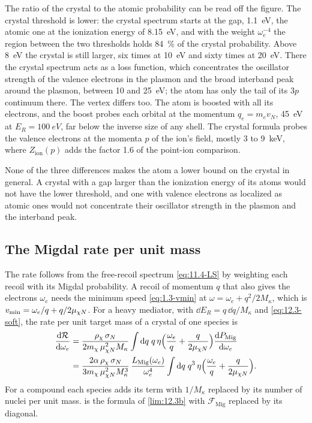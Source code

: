 The ratio of the crystal to the atomic probability can be read off the figure. The crystal threshold is lower: the crystal spectrum starts at the gap, \SI{1.1}{eV}, the atomic one at the ionization energy of \SI{8.15}{eV}, and with the weight $\omega_e^{-4}$ the region between the two thresholds holds \SI{84}{\percent} of the crystal probability. Above \SI{8}{eV} the crystal is still larger, six times at \SI{10}{eV} and sixty times at \SI{20}{eV}. There the crystal spectrum acts as a loss function, which concentrates the oscillator strength of the valence electrons in the plasmon and the broad interband peak around the plasmon, between 10 and \SI{25}{eV}; the atom has only the tail of its $3p$ continuum there. The vertex differs too. The atom is boosted with all its electrons, and the boost probes each orbital at the momentum $q_e = m_ev_N$, \SI{45}{eV} at $E_R = \SI{100}{eV}$, far below the inverse size of any shell. The crystal formula probes the valence electrons at the momenta $p$ of the ion's field, mostly 3 to \SI{9}{keV}, where $Z_{\mathrm{ion}}(p)$ adds the factor 1.6 of the point-ion comparison.

None of the three differences makes the atom a lower bound on the crystal in general. A crystal with a gap larger than the ionization energy of its atoms would not have the lower threshold, and one with valence electrons as localized as atomic ones would not concentrate their oscillator strength in the plasmon and the interband peak.

\subsection{The Migdal rate per unit mass}\label{sec:12.3-rate}

The rate follows from the free-recoil spectrum \cref{eq:11.4-LS} by weighting each recoil with its Migdal probability. A recoil of momentum $q$ that also gives the electrons $\omega_e$ needs the minimum speed \cref{eq:1.3-vmin} at $\omega = \omega_e + q^2/2M_\kappa$, which is $v_{\mathrm{min}} = \omega_e/q + q/2\mu_{\chi N}$. For a heavy mediator, with $\dd E_R = q\,\dd q/M_\kappa$ and \cref{eq:12.3-soft}, the rate per unit target mass of a crystal of one species is
\begin{equation}
  \begin{aligned}
  \frac{\mathrm{d}\mathcal{R}}{\mathrm{d}\omega_e} &= \frac{\rho_\chi\,\sigma_N}{2m_{\chi}\,\mu_{\chi N}^2M_\kappa}\int\mathrm{d} q\;q\,\eta\Bigl(\frac{\omega_e}{q} + \frac{q}{2\mu_{\chi N}}\Bigr)\frac{\mathrm{d} P_{\mathrm{Mig}}}{\mathrm{d}\omega_e} \\
  &= \frac{2\alpha\,\rho_\chi\,\sigma_N}{3m_{\chi}\,\mu_{\chi N}^2M_\kappa^3}\,\frac{L_{\mathrm{Mig}}(\omega_e)}{\omega_e^4}\int\mathrm{d} q\;q^3\,\eta\Bigl(\frac{\omega_e}{q} + \frac{q}{2\mu_{\chi N}}\Bigr) .
  \end{aligned}
  \label{eq:12.3-rate}
\end{equation}
For a compound each species adds its term with $1/M_\kappa$ replaced by its number of nuclei per unit mass.  is the formula of \cref{lim:12.3b} with $\mathcal{F}_{\mathrm{Mig}}$ replaced by its diagonal.

